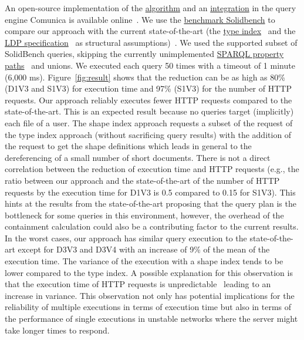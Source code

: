 An open-source implementation of the \href{https://github.com/constraintAutomaton/query-shape-detection}{algorithm} and an 
\href{https://github.com/constraintAutomaton/comunica-feature-link-traversal/tree/feature/shapeIndex}{integration} in the query engine 
Comunica \cite{taelman_iswc_resources_comunica_2018} is available online~.
We use the \href{https://github.com/SolidBench/SolidBench.js}{benchmark Solidbench} \cite{Taelman2023} to compare our approach with the current state-of-the-art (the \href{https://solid.github.io/type-indexes/}{type index}~ and the \href{https://www.w3.org/TR/ldp/}{LDP specification}~ as structural assumptions)~\cite{Taelman2023}.
We used the supported subset of SolidBench queries, skipping the currently unimplemented \href{https://www.w3.org/TR/sparql11-query/#propertypaths}{SPARQL property paths}~ and unions.
We executed each query 50 times with a timeout of 1 minute (6,000 ms).
Figure~\ref{fig:result} shows that the reduction can be as high as 80\% (D1V3 and S1V3) for execution time 
and 97\% (S1V3) for the number of HTTP requests.
Our approach reliably executes fewer HTTP requests compared to the state-of-the-art.
This is an expected result because no queries target (implicitly) each file of a user.
The shape index approach requests a subset of the request of the type index approach (without sacrificing query results) with the addition of the request to get the shape definitions which leads in general to the dereferencing of a small number of short documents.
There is not a direct correlation between the reduction of execution time and HTTP requests (e.g., the ratio 
between our approach and the state-of-the-art of the number of HTTP requests by the execution time for D1V3 is 0.5 compared to 0.15 for S1V3).
This hints at the results from the state-of-the-art \cite{Taelman2023} proposing that the query plan is the bottleneck for some queries in this environment,
however, the overhead of the containment calculation could also be a contributing factor to the current results.
In the worst cases, our approach  has similar query execution to the state-of-the-art except for D3V3 and D3V4 with an increase of 9\% of the mean of the execution time.
The variance of the execution with a shape index tends to be lower compared to the type index. 
A possible explanation for this observation is that the execution time of HTTP requests is unpredictable~\cite{hartig2016walking}
leading to an increase in variance.
This observation not only has potential implications for the reliability of multiple executions in terms of execution time
but also in terms of the performance of single executions in unstable networks where the server might take longer times to respond. 

